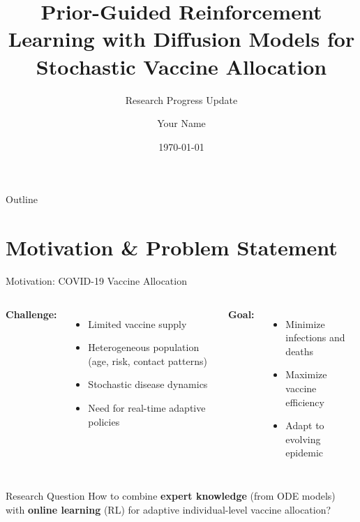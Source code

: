 \documentclass[aspectratio=169]{beamer}
\title[Prior-Guided RL for Vaccine Allocation]{Prior-Guided Reinforcement Learning with Diffusion Models for Stochastic Vaccine Allocation}
\subtitle{Research Progress Update}
\author{Your Name}
\institute{University Name \\ Advisor: Prof. Sarkar}
\date{\today}
\begin{document}
\frame{\titlepage}

\begin{frame}{Outline}
\tableofcontents
\end{frame}

\section{Motivation \& Problem Statement}

\begin{frame}{Motivation: COVID-19 Vaccine Allocation}

\begin{columns}
\textbf{Challenge:}
\begin{itemize}
    \item Limited vaccine supply
    \item Heterogeneous population (age, risk, contact patterns)
    \item Stochastic disease dynamics
    \item Need for \alert{real-time adaptive policies}
\end{itemize}

\vspace{1em}
\textbf{Goal:}
\begin{itemize}
    \item Minimize infections and deaths
    \item Maximize vaccine efficiency
    \item Adapt to evolving epidemic
\end{itemize}

\centering
{}
\end{columns}

\vspace{1em}
\begin{block}{Research Question}
How to combine \textbf{expert knowledge} (from ODE models) with \textbf{online learning} (RL) for adaptive individual-level vaccine allocation?
\end{block}

\end{frame}
\end{document}
